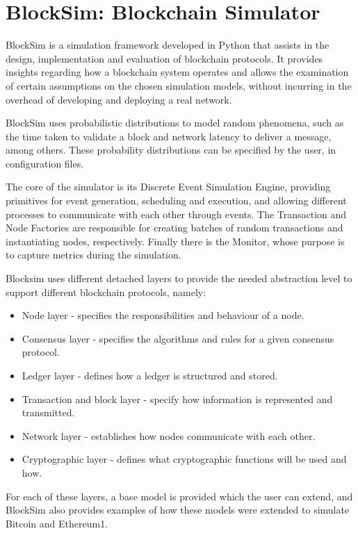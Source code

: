 \section{BlockSim: Blockchain Simulator}
\label{sec:blocksim1}

BlockSim \cite{blocksim1} is a simulation framework developed in Python that assists in the design, implementation and evaluation of blockchain protocols. It provides insights regarding how a blockchain system operates and allows the examination of certain assumptions on the chosen simulation models, without incurring in the overhead of developing and deploying  a real network.

BlockSim uses probabilistic distributions to model random phenomena, such as the time taken to validate a block and network latency to deliver a message, among others. These probability distributions can be specified by the user, in configuration files.

The core of the simulator is its Discrete Event Simulation Engine, providing primitives for event generation, scheduling and execution, and allowing different processes to communicate with each other through events. The Transaction and Node Factories are responsible for creating batches of random transactions and instantiating nodes, respectively. Finally there is the Monitor, whose purpose is to capture metrics during the simulation.

Blocksim uses different detached layers to provide the needed abstraction level to support different blockchain protocols, namely:

\begin{itemize}
	\item Node layer - specifies the responsibilities and behaviour of a node.
	\item Consensus layer - specifies the algorithms and rules for a given consensus protocol.
	\item Ledger layer - defines how a ledger is structured and stored.
	\item Transaction and block layer - specify how information is represented and transmitted.
	\item Network layer - establishes how nodes communicate with each other.
	\item Cryptographic layer - defines what cryptographic functions will be used and how.
\end{itemize}

For each of these layers, a base model is provided which the user can extend, and BlockSim also provides examples of how these models were extended to simulate Bitcoin and Ethereum1.


